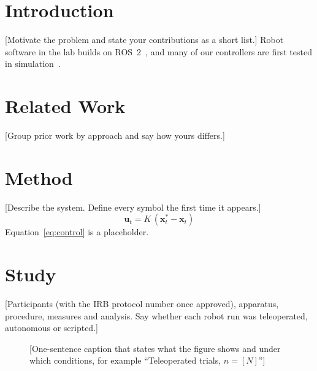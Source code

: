 \documentclass[sigconf,review,anonymous]{acmart}
\begin{document}

\maketitle

\section{Introduction}
[Motivate the problem and state your contributions as a short list.]
Robot software in the lab builds on ROS~2~\cite{macenski2022ros2,ros2jazzydocs},
and many of our controllers are first tested in simulation~\cite{todorov2012mujoco}.

\section{Related Work}
[Group prior work by approach and say how yours differs.]

\section{Method}
[Describe the system. Define every symbol the first time it appears.]
\begin{equation}
  \mathbf{u}_t = K\,(\mathbf{x}^{*}_t - \mathbf{x}_t)
  \label{eq:control}
\end{equation}
Equation~\eqref{eq:control} is a placeholder.

\section{Study}
[Participants (with the IRB protocol number once approved), apparatus,
procedure, measures and analysis. Say whether each robot run was
teleoperated, autonomous or scripted.]

\begin{figure}[t]
  \centering
  \caption{[One-sentence caption that states what the figure shows and under
  which conditions, for example ``Teleoperated trials, $n=[N]$'']}
  \label{fig:overview}
\end{figure}
\end{document}
